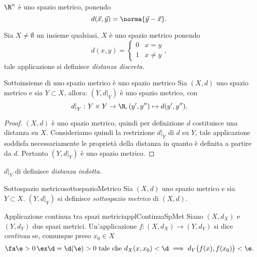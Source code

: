 \begin{ese}
    $\R^n$ è uno spazio metrico, ponendo
    \[
        d(\vec{x},\vec{y})=\norma{\vec{y}-\vec{x}}.
    \]
\end{ese}

\begin{ese}
    Sia $X\neq\emptyset$ un insieme qualsiasi, $X$ è uno spazio metrico ponendo
    \[
        d(x,y)= \begin{cases}
            0 & x=y     \\
            1 & x\neq y
        \end{cases},
    \]
    tale applicazione si definisce \emph{distanza discreta}.
\end{ese}

\begin{prop}{Sottoinsieme di uno spazio metrico è uno spazio metrico}{}
    Sia $(X,d)$ uno spazio metrico e sia $Y\subset X$, allora:
    $(Y,\left. d\right|_Y)$ è uno spazio metrico, con
    \[
        \left. d\right|_Y\colon Y\times Y\to\R,(y',y'')\mapsto d(y',y'').
    \]
\end{prop}

\begin{proof}
    $(X,d)$ è uno spazio metrico, quindi per definizione $d$ costituisce una distanza su $X$. Consideriamo quindi la restrizione $\left. d\right|_Y$ di $d$ su $Y$, tale applicazione soddisfa necessariamente le proprietà della distanza in quanto è definita a partire da $d$. Pertanto $(Y,\left. d\right|_Y)$ è uno spazio metrico.
\end{proof}

\begin{notz}
    $\left. d\right|_Y$ di definisce \emph{distanza indotta}.
\end{notz}

\begin{defn}{Sottospazio metrico}{sottospazioMetrico}
    Sia $(X,d)$ uno spazio metrico e sia $Y\subset X$.
    $(Y,\left. d\right|_Y)$ si definisce \emph{sottospazio metrico} di $(X,d)$.
\end{defn}

\begin{defn}{Applicazione continua tra spazi metrici}{applContinuaSpMet}
    Siano $(X,d_X)$ e $(Y,d_Y)$ due spazi metrici. Un'applicazione $f\colon (X,d_X)\to (Y,d_Y)$ si dice \emph{continua} se, comunque preso $x_0\in X$
    \[
        \fa\e >0\,\ex\d=\d(\e)>0\text{ tale che }d_X(x,x_0)<\d\implies d_Y\big(f(x),f(x_0)\big)<\e.
    \]
\end{defn}


